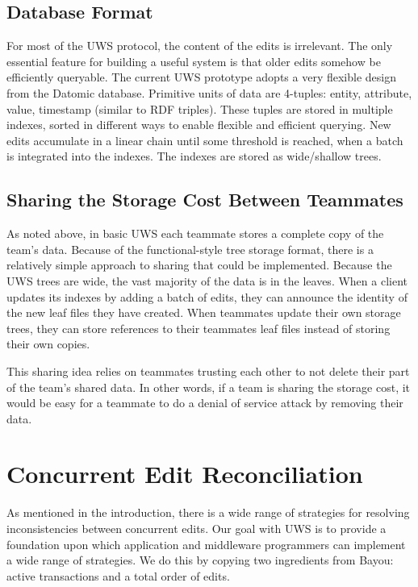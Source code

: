 \documentclass[runningheads]{llncs}
\begin{document}
\subsection{Database Format}

For most of the UWS protocol, the content of the edits is irrelevant.
The only essential feature for building a useful system is that older edits somehow be efficiently queryable.
The current UWS prototype adopts a very flexible design from the Datomic database.
Primitive units of data are 4-tuples: entity, attribute, value, timestamp (similar to RDF triples).
These tuples are stored in multiple indexes, sorted in different ways to enable flexible and efficient querying.
New edits accumulate in a linear chain until some threshold is reached, when a batch is integrated into the indexes.
The indexes are stored as wide{\slash}shallow trees.

\subsection{Sharing the Storage Cost Between Teammates}

As noted above, in basic UWS each teammate stores a complete copy of the team's data.
Because of the functional-style tree storage format, there is a relatively simple approach to sharing that could be implemented.
Because the UWS trees are wide, the vast majority of the data is in the leaves.
When a client updates its indexes by adding a batch of edits, they can announce the identity of the new leaf files they have created.
When teammates update their own storage trees, they can store references to their teammates leaf files instead of storing their own copies.

This sharing idea relies on teammates trusting each other to not delete their part of the team's shared data.
In other words, if a team is sharing the storage cost, it would be easy for a teammate to do a denial of service attack by removing their data.

\section{Concurrent Edit Reconciliation}

As mentioned in the introduction, there is a wide range of strategies for resolving inconsistencies between concurrent edits.
Our goal with UWS is to provide a foundation upon which application and middleware programmers can implement a wide range of strategies.
We do this by copying two ingredients from Bayou: active transactions and a total order of edits.
\end{document}
